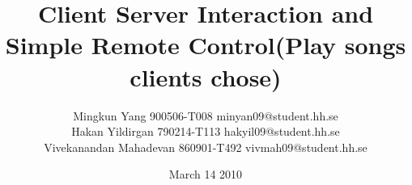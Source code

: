 \documentclass{report}
\begin{document}
\title{Client Server Interaction and Simple Remote Control(Play songs clients chose)}
\author{Mingkun Yang 900506-T008 minyan09@student.hh.se \\
	Hakan Yildirgan	790214-T113 hakyil09@student.hh.se\\
	Vivekanandan Mahadevan 	860901-T492 vivmah09@student.hh.se}
\date{March 14 2010}
\maketitle








\end{document}
